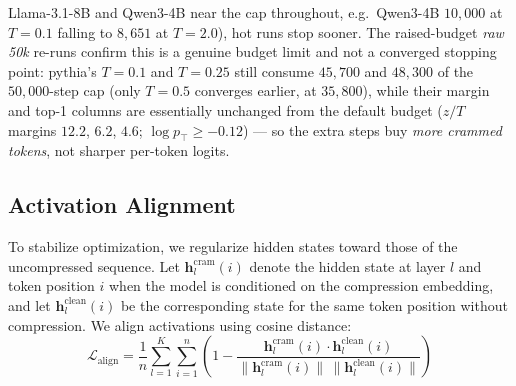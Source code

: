 Llama-3.1-8B and Qwen3-4B near the cap throughout, e.g.\ Qwen3-4B $10{,}000$ at $T{=}0.1$ falling to $8{,}651$ at $T{=}2.0$), hot runs stop sooner. The raised-budget \emph{raw 50k} re-runs confirm this is a genuine budget limit and not a converged stopping point: pythia's $T{=}0.1$ and $T{=}0.25$ still consume $45{,}700$ and $48{,}300$ of the $50{,}000$-step cap (only $T{=}0.5$ converges earlier, at $35{,}800$), while their margin and top-1 columns are essentially unchanged from the default budget ($z/T$ margins $12.2$, $6.2$, $4.6$; $\log p_{\top}\ge -0.12$) --- so the extra steps buy \emph{more crammed tokens}, not sharper per-token logits.

\begin{table}[t]
    \centering
    \caption{Reconstruction logit geometry vs.\ CE temperature, in the loss's own units $\mathbf{z}/T$. For each run we average, over the tokens the converged \texttt{[mem]} embedding reconstructs at its final stage, the total optimization steps per sample (cumulative, capped at each run's per-sample budget --- $10{,}000$ by default, $50{,}000$ for the raised-budget \emph{raw 50k} re-runs), the true-token margin $(z_{\text{true}}-\text{runner-up})/T$, and the top-1 logit in two forms: \emph{unnormalized} $(\max_j z_j)/T$ and \emph{normalized} $\log p_{\top}=\log\mathrm{softmax}(\mathbf{z}/T)_{\arg\max}=(\max_j z_j)/T-\log\sum_j e^{z_j/T}$ --- the winner's log-probability under the temperature softmax the loss actually uses ($\le 0$; $0$ = all mass on the winner). The two top-1 columns differ exactly by the mean log-partition $\log\sum_j e^{z_j/T}$. The raw logits $\mathbf{z}$ are the model outputs used at decode time; the $\mathbf{z}/T$ normalization removes the trivial $\mathbf{z}\propto T$ rescaling (\S\ref{app:ce_temperature}). Panels and row labels match Table~\ref{tab:progressive_temperature}; averages over 50 PG19 samples.}
    \label{tab:temperature_logit_stats}
    \begin{small}
    
    \end{small}
\vskip -0.1in
\end{table}

\subsection{Activation Alignment}
\label{app:activation_alignment}

To stabilize optimization, we regularize hidden states toward those of the uncompressed sequence.
Let $\mathbf{h}_l^{\text{cram}}(i)$ denote the hidden state at layer $l$ and token position $i$ when the model is conditioned on the compression embedding, and let $\mathbf{h}_l^{\text{clean}}(i)$ be the corresponding state for the same token position without compression.
We align activations using cosine distance:
%
\begin{equation}
    \mathcal{L}_{\text{align}} = \frac{1}{n} \sum_{l=1}^{K} \sum_{i=1}^{n} \left( 1 - \frac{\mathbf{h}_l^{\text{cram}}(i) \cdot \mathbf{h}_l^{\text{clean}}(i)}{\|\mathbf{h}_l^{\text{cram}}(i)\| \, \|\mathbf{h}_l^{\text{clean}}(i)\|} \right)
\end{equation}
%

